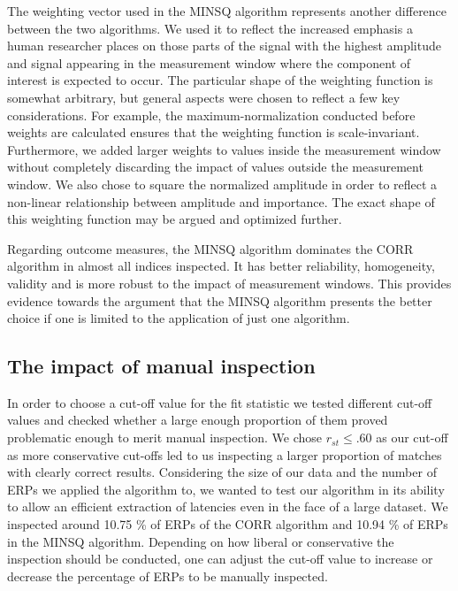 \documentclass[
  man]{apa7}
\begin{document}
The weighting vector used in the MINSQ algorithm represents another difference between the two algorithms. We used it to reflect the increased emphasis a human researcher places on those parts of the signal with the highest amplitude and signal appearing in the measurement window where the component of interest is expected to occur. The particular shape of the weighting function is somewhat arbitrary, but general aspects were chosen to reflect a few key considerations. For example, the maximum-normalization conducted before weights are calculated ensures that the weighting function is scale-invariant. Furthermore, we added larger weights to values inside the measurement window without completely discarding the impact of values outside the measurement window. We also chose to square the normalized amplitude in order to reflect a non-linear relationship between amplitude and importance. The exact shape of this weighting function may be argued and optimized further.

Regarding outcome measures, the MINSQ algorithm dominates the CORR algorithm in almost all indices inspected. It has better reliability, homogeneity, validity and is more robust to the impact of measurement windows. This provides evidence towards the argument that the MINSQ algorithm presents the better choice if one is limited to the application of just one algorithm.

\hypertarget{the-impact-of-manual-inspection}{%
\subsection{The impact of manual inspection}\label{the-impact-of-manual-inspection}}

In order to choose a cut-off value for the fit statistic we tested different cut-off values and checked whether a large enough proportion of them proved problematic enough to merit manual inspection. We chose \(r_{st} \le .60\) as our cut-off as more conservative cut-offs led to us inspecting a larger proportion of matches with clearly correct results. Considering the size of our data and the number of ERPs we applied the algorithm to, we wanted to test our algorithm in its ability to allow an efficient extraction of latencies even in the face of a large dataset. We inspected around 10.75 \% of ERPs of the CORR algorithm and 10.94 \% of ERPs in the MINSQ algorithm. Depending on how liberal or conservative the inspection should be conducted, one can adjust the cut-off value to increase or decrease the percentage of ERPs to be manually inspected.
\end{document}
